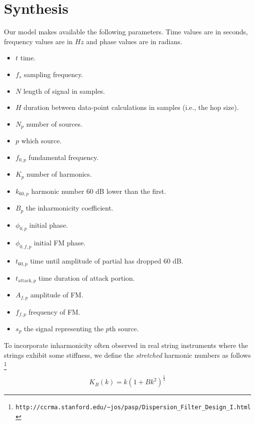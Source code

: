 \section{Synthesis}
Our model makes available the following parameters. Time values are in seconds,
frequency values are in $Hz$ and phase values are in radians.
\begin{itemize}
    \item
        $t$ time.
    \item
        $f_{s}$ sampling frequency.
    \item
        $N$ length of signal in samples.
    \item
        $H$ duration between data-point calculations in samples (i.e., the hop
        size).
    \item
        $N_{p}$ number of sources.
    \item
        $p$ which source.
    \item
        $f_{0,p}$ fundamental frequency.
    \item
        $K_{p}$ number of harmonics.
    \item
        $k_{60,p}$ harmonic number 60 dB lower than the first.
    \item 
        $B_{p}$ the inharmonicity coefficient.
    \item
        $\phi_{0,p}$ initial phase.
    \item
        $\phi_{0,f,p}$ initial FM phase.
    \item
        $t_{60,p}$ time until amplitude of partial has dropped 60 dB.
    \item
        $t_{\text{attack},p}$ time duration of attack portion.
    \item
        $A_{f,p}$ amplitude of FM.
    \item
        $f_{f,p}$ frequency of FM.
    \item
        $s_{p}$ the signal representing the $p$th source.
\end{itemize}

To incorporate inharmonicity often observed in real string instruments where the
strings exhibit some stiffness, we define the \textit{stretched} harmonic numbers
as follows
\cite{paspweb2010}\footnote{
\texttt{http://ccrma.stanford.edu/\~{}jos/pasp/Dispersion\_Filter\_Design\_I.html}}

\begin{equation}
    K_{B}(k) = k (1+Bk^{2})^{\frac{1}{2}}
\end{equation}

